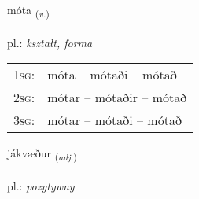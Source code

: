 \documentclass[frontgrid, backgrid]{flacards}\usepackage[]{graphicx}\usepackage[]{xcolor}
\begin{document}
\renewcommand{\blhead}{\vskip5pt {\small\bfseries\footnotesize Sagnorð | Verb }}
\renewcommand{\bcfoot}{\vskip5pt \hspace{2pt}{\small\bfseries\footnotesize 1K}}


{móta \small{\textsubscript{(\textit{v.})}} \\[1ex] %
\textphonetic{[mouːta]} \\
pl.: \emph{kształt, forma} \\  [2ex]
\renewcommand*{\arraystretch}{0.8}
\begin{tabular}{p{1cm}l}
\textsc{1sg}: & móta -- mótaði -- mótað \\ 
\textsc{2sg}: & mótar -- mótaðir -- mótað \\ 
\textsc{3sg}: & mótar -- mótaði -- mótað \\ 
\end{tabular}
}

\renewcommand{\flhead}{\vskip5pt \fboxsep=0pt {\small\bfseries\footnotesize Lýsingarorð | Adjective}}
\renewcommand{\fcfoot}{\vskip5pt \fboxsep=0pt \hspace{2pt}{\small\bfseries\footnotesize 1K}}

\renewcommand{\blhead}{\vskip5pt {\small\bfseries\footnotesize Lýsingarorð | Adjective }}
\renewcommand{\bcfoot}{\vskip5pt \hspace{2pt}{\small\bfseries\footnotesize 1K}}


{jákvæður \small{\textsubscript{(\textit{adj.})}} \\[1ex] %
\textphonetic{[jauːkʰvaiðʏr]} \\
pl.: \emph{pozytywny} \\  [2ex]
\renewcommand*{\arraystretch}{0.8}
}
\end{document}
